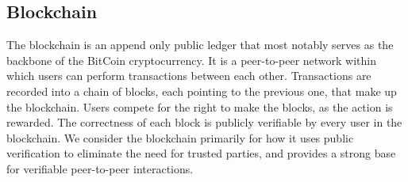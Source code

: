 \subsection{Blockchain}
The blockchain is an append only public ledger that most notably serves as the backbone of the BitCoin cryptocurrency. It is a peer-to-peer network within which users can perform transactions between each other. Transactions are recorded into a chain of blocks, each pointing to the previous one, that make up the blockchain. Users compete for the right to make the blocks, as the action is rewarded. The correctness of each block is publicly verifiable by every user in the blockchain. 
We consider the blockchain primarily for how it uses public verification to eliminate the need for trusted parties, and provides a strong base for verifiable peer-to-peer interactions. 

